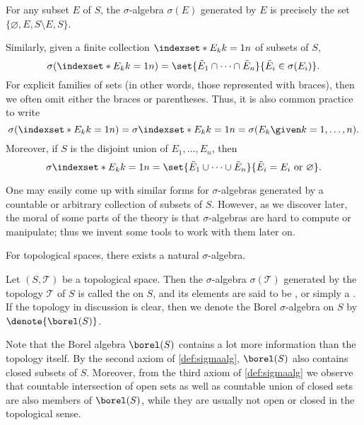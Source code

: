 \begin{example}
    \label{exm:gensigmaalg}
    \begin{alist}
        \item For any subset \(E\) of \(S\),
        the \(\sigma\)-algebra \(\sigma(E)\) generated by \(E\)
        is precisely the set \(\{\varnothing,E,S\setminus E,S\}\).
        \item Similarly,
        given a finite collection \(\indexset*{E_k}{k=1}{n}\)
        of subsets of \(S\),
        \[
            \sigma(\indexset*{E_k}{k=1}{n})
            =\set{\tilde E_1\cap\dots\cap\tilde E_n}%
                {\tilde E_i\in\sigma(E_i)}.
        \]
        For explicit families of sets
        (in other words, those represented with braces),
        then we often omit either the braces or parentheses.
        Thus, it is also common practice to write
        \[
            \sigma(\indexset*{E_k}{k=1}{n})
            =\sigma\indexset*{E_k}{k=1}{n}
            =\sigma(E_k\given k=1,\dots,n).
        \]
        Moreover, if \(S\) is the disjoint union of \(E_1,\dots,E_n\),
        then
        \[
            \sigma\indexset*{E_k}{k=1}{n}
            =\set{\tilde E_1\cup\dots\cup\tilde E_n}%
                {\tilde E_i=E_i\ \text{or}\ \varnothing}.
        \]
    \end{alist}
\end{example}
One may easily come up with similar forms for \(\sigma\)-algebras
generated by a countable or arbitrary collection of subsets of \(S\).
However, as we discover later,
the moral of some parts of the theory is that
\(\sigma\)-algebras are hard to compute or manipulate;
thus we invent some tools to work with them later on.

For topological spaces, there exists a natural \(\sigma\)-algebra.

\begin{definition}
    \label{def:borelsig}
    Let \((S,\mathcal T)\) be a topological space.
    Then the \(\sigma\)-algebra \(\sigma(\mathcal T)\)
    generated by the topology \(\mathcal T\) of \(S\)
    is called the  on \(S\),
    and its elements are said
    to be ,
    or simply a .
    If the topology in discussion is clear,
    then we denote the Borel \(\sigma\)-algebra on \(S\)
    by \(\denote{\borel(S)}\).
\end{definition}

Note that
the Borel algebra \(\borel(S)\) contains a lot more information
than the topology itself.
By the second axiom of \cref{def:sigmaalg},
\(\borel(S)\) also contains closed subsets of \(S\).
Moreover, from the third axiom of \cref{def:sigmaalg}
we observe that countable intersection of open sets
as well as countable union of closed sets
are also members of \(\borel(S)\),
while they are usually not open or closed in the topological sense.

